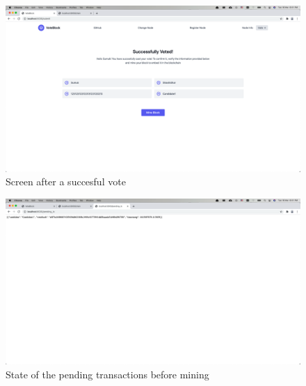 \documentclass{article}
\begin{document}
    \begin{figure}[h]
        \centering
        \includegraphics[width=1\textwidth]{successful_vote.png}
        \caption{Screen after a succesful vote}
    \end{figure}
    \begin{figure}[h]
        \centering
        \includegraphics[width=1\textwidth]{pending_trans_dump.png}
        \caption{State of the pending transactions before mining}
    \end{figure}
\end{document}
